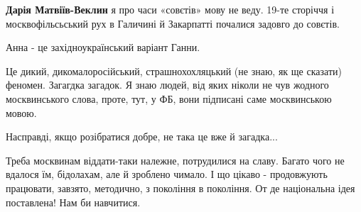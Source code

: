 \begin{itemize}
\begin{itemize}
\textbf{Дарія Матвіїв-Веклин} я про часи «совєтів» мову не веду. 19-те сторіччя і москвофільсьський рух в Галичині й Закарпатті почалися задовго до совєтів.

Анна - це західноукраїнський варіант Ганни.

\end{itemize} %


Це дикий, дикомалоросійський, страшнохохляцький (не знаю, як ще сказати)
феномен. Загагдка загадок. Я знаю людей, від яких ніколи не чув жодного
москвинського слова, проте, тут, у ФБ, вони підписані саме москвинською мовою.

Насправді, якщо розібратися добре, не така це вже й загадка...

Треба москвинам віддати-таки належне, потрудилися на славу. Багато чого не
вдалося їм, бідолахам, але й зроблено чимало. І що цікаво - продовжують
працювати, завзято, методично, з покоління в покоління. От де національна ідея
поставлена! Нам би навчитися.

\end{itemize} %
